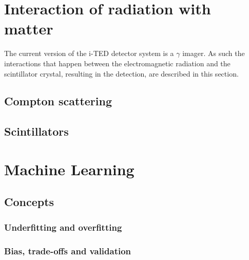 \section{Interaction of radiation with matter}\label{sec:interaction}

The current version of the \ac{i-TED} detector system is a $\gamma$ imager. As such the interactions that happen between the electromagnetic radiation and the scintillator crystal, resulting in the detection, are described in this section.

\subsection{Compton scattering}

\subsection{Scintillators}

\section{Machine Learning}\label{sec:ml}

\subsection{Concepts}

\subsubsection{Underfitting and overfitting}

\subsubsection{Bias, trade-offs and validation}

